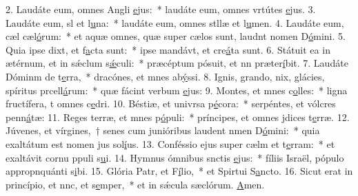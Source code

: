 2. Laudáte eum, omnes Angli \uline{e}jus:~* laudáte eum, omnes vrtútes \uline{e}jus.
3. Laudáte eum, sl et l\uline{u}na:~* laudáte eum, omnes stllæ et l\uline{u}men.
4. Laudáte eum, cæl cæl\uline{ó}rum:~* et aquæ omnes, quæ super cælos sunt, laudnt nomen D\uline{ó}mini.
5. Quia ipse dixt, et f\uline{a}cta sunt:~* ipse mandávt, et cre\uline{á}ta sunt.
6. Státuit ea in ætérnum, et in sǽclum s\uline{ǽ}culi:~* præcéptum pósuit, et nn præter\uline{í}bit.
7. Laudáte Dóminm de t\uline{e}rra,~* dracónes, et mnes ab\uline{ý}ssi.
8. Ignis, grando, nix, glácies, spíritus prcell\uline{á}rum:~* quæ fácint verbum \uline{e}jus:
9. Montes, et mnes c\uline{o}lles:~* ligna fructífera, t omnes c\uline{e}dri.
10. Béstiæ, et univrsa p\uline{é}cora:~* serpéntes, et vólcres penn\uline{á}tæ:
11. Reges terræ, et mnes p\uline{ó}puli:~* príncipes, et omnes jdices t\uline{e}rræ.
12. Júvenes, et vírgines,~† senes cum junióribus laudent nmen D\uline{ó}mini:~* quia exaltátum est nomen jus sol\uline{í}us.
13. Conféssio ejus super cælm et t\uline{e}rram:~* et exaltávit cornu ppuli s\uline{u}i.
14. Hymnus ómnibus snctis \uline{e}jus:~* fíliis Israël, pópulo appropnquánti s\uline{i}bi.
15. Glória Patr, et F\uline{í}lio,~* et Spirtui S\uline{a}ncto.
16. Sicut erat in princípio, et nnc, et s\uline{e}mper,~* et in sǽcula sæclórum. \uline{A}men.
